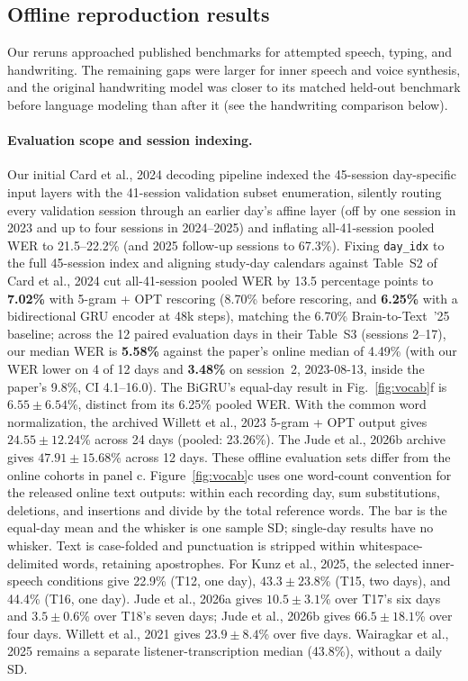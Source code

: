 \documentclass[11pt]{article}
\begin{document}
\subsection{Offline reproduction results}

Our reruns approached published benchmarks for attempted speech,
typing, and handwriting. The remaining gaps were larger for inner
speech and voice synthesis, and the original handwriting model was
closer to its matched held-out benchmark before language modeling than
after it (see the handwriting comparison below).

\paragraph{Evaluation scope and session indexing.} Our initial Card et al.,
2024 decoding pipeline indexed the 45-session day-specific input layers
with the 41-session validation subset enumeration, silently routing
every validation session through an earlier day's affine layer (off by
one session in 2023 and up to four sessions in 2024--2025) and inflating
all-41-session pooled WER to 21.5--22.2\% (and 2025 follow-up sessions
to 67.3\%). Fixing \texttt{day\_idx} to the full 45-session index and aligning
study-day calendars against Table~S2 of Card et al., 2024 cut all-41-session
pooled WER by 13.5 percentage points to \textbf{7.02\%} with 5-gram +
OPT rescoring (8.70\% before rescoring, and \textbf{6.25\%} with a
bidirectional GRU encoder at 48k steps), matching the 6.70\%
Brain-to-Text~'25 baseline; across the 12 paired evaluation days in
their Table~S3 (sessions 2--17), our median WER is \textbf{5.58\%} against the
paper's online median of 4.49\% (with our WER lower on 4 of 12 days and
\textbf{3.48\%} on session~2, 2023-08-13, inside the paper's 9.8\%, CI
4.1--16.0). The BiGRU's equal-day result in Fig.~\ref{fig:vocab}f is
$6.55\pm6.54$\%, distinct from its 6.25\% pooled WER. With the common
word normalization, the archived Willett et al., 2023 5-gram + OPT
output gives $24.55\pm12.24$\% across 24 days (pooled: 23.26\%).
The Jude et al., 2026b archive gives $47.91\pm15.68$\% across 12 days.
These offline evaluation sets differ from the online cohorts in panel c.
Figure~\ref{fig:vocab}c uses one word-count convention for the released
online text outputs: within each recording day, sum substitutions,
deletions, and insertions and divide by the total reference words.
The bar is the equal-day mean and the whisker is one sample SD;
single-day results have no whisker. Text is case-folded and punctuation
is stripped within whitespace-delimited words, retaining apostrophes.
For Kunz et al., 2025, the selected inner-speech conditions give 22.9\%
(T12, one day), $43.3\pm23.8$\% (T15, two days), and 44.4\%
(T16, one day). Jude et al., 2026a gives $10.5\pm3.1$\% over T17's
six days and $3.5\pm0.6$\% over T18's seven days; Jude et al., 2026b
gives $66.5\pm18.1$\% over four days. Willett et al., 2021 gives
$23.9\pm8.4$\% over five days. Wairagkar et al., 2025 remains a
separate listener-transcription median (43.8\%), without a daily SD.
\end{document}
